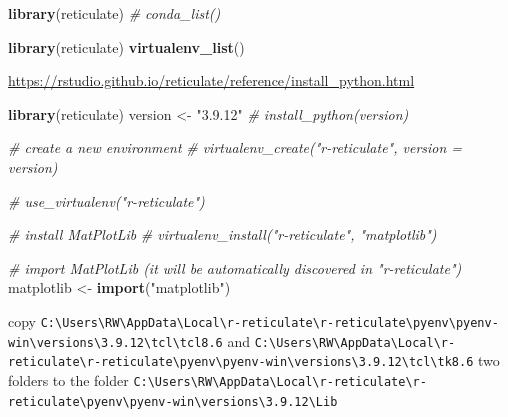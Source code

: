 \documentclass[
]{book}
\newenvironment{Shaded}{\begin{snugshade}}{\end{snugshade}}
\newcommand{\CommentTok}[1]{\textcolor[rgb]{0.56,0.35,0.01}{\textit{#1}}}
\newcommand{\FunctionTok}[1]{\textcolor[rgb]{0.13,0.29,0.53}{\textbf{#1}}}
\newcommand{\NormalTok}[1]{#1}
\newcommand{\OtherTok}[1]{\textcolor[rgb]{0.56,0.35,0.01}{#1}}
\newcommand{\StringTok}[1]{\textcolor[rgb]{0.31,0.60,0.02}{#1}}
\theoremstyle{definition}
\theoremstyle{definition}
\theoremstyle{definition}
\theoremstyle{definition}
\theoremstyle{remark}
\begin{document}
\begin{Shaded}
\begin{Highlighting}[]
\FunctionTok{library}\NormalTok{(reticulate)}
\CommentTok{\# conda\_list()}
\end{Highlighting}
\end{Shaded}

\begin{Shaded}
\begin{Highlighting}[]
\FunctionTok{library}\NormalTok{(reticulate)}
\FunctionTok{virtualenv\_list}\NormalTok{()}
\end{Highlighting}
\end{Shaded}

\url{https://rstudio.github.io/reticulate/reference/install_python.html}

\begin{Shaded}
\begin{Highlighting}[]
\FunctionTok{library}\NormalTok{(reticulate)}
\NormalTok{version }\OtherTok{\textless{}{-}} \StringTok{"3.9.12"}
\CommentTok{\# install\_python(version)}

\CommentTok{\# create a new environment}
\CommentTok{\# virtualenv\_create("r{-}reticulate", version = version)}

\CommentTok{\# use\_virtualenv("r{-}reticulate")}

\CommentTok{\# install MatPlotLib}
\CommentTok{\# virtualenv\_install("r{-}reticulate", "matplotlib")}

\CommentTok{\# import MatPlotLib (it will be automatically discovered in "r{-}reticulate")}
\NormalTok{matplotlib }\OtherTok{\textless{}{-}} \FunctionTok{import}\NormalTok{(}\StringTok{"matplotlib"}\NormalTok{)}
\end{Highlighting}
\end{Shaded}

copy \texttt{C:\textbackslash{}Users\textbackslash{}RW\textbackslash{}AppData\textbackslash{}Local\textbackslash{}r-reticulate\textbackslash{}r-reticulate\textbackslash{}pyenv\textbackslash{}pyenv-win\textbackslash{}versions\textbackslash{}3.9.12\textbackslash{}tcl\textbackslash{}tcl8.6} and \texttt{C:\textbackslash{}Users\textbackslash{}RW\textbackslash{}AppData\textbackslash{}Local\textbackslash{}r-reticulate\textbackslash{}r-reticulate\textbackslash{}pyenv\textbackslash{}pyenv-win\textbackslash{}versions\textbackslash{}3.9.12\textbackslash{}tcl\textbackslash{}tk8.6} two folders to the folder \texttt{C:\textbackslash{}Users\textbackslash{}RW\textbackslash{}AppData\textbackslash{}Local\textbackslash{}r-reticulate\textbackslash{}r-reticulate\textbackslash{}pyenv\textbackslash{}pyenv-win\textbackslash{}versions\textbackslash{}3.9.12\textbackslash{}Lib}
\end{document}
